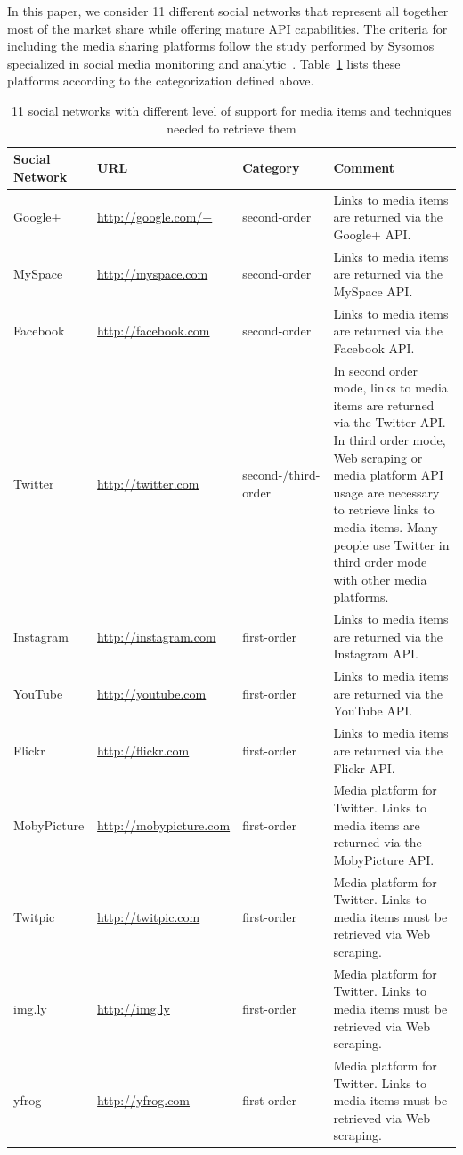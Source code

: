 \documentclass{acm_proc_article-sp}
\newcommand{\inlinelistingsize}{\fontsize{8pt}{11pt}}
\let\oldurl\url
\renewcommand{\url}[1]{\inlinelistingsize\oldurl{#1}}
\begin{document}
In this paper, we consider 11 different social networks that represent all together most of the market share while offering mature API capabilities.
The criteria for including the media sharing platforms follow the study performed by Sysomos specialized in social media monitoring and analytic~\cite{Sysomos2011}. Table~\ref{tab:platforms} lists these platforms according to the categorization defined above.
\begin{table}[htbp]
  {\small
  \begin{tabular}{|l|l|l|p{8cm}|}
    \hline
    \textbf{Social Network} & \textbf{URL} & \textbf{Category} & \textbf{Comment}\\
    \hline
	Google+ & \url{http://google.com/+} & second-order & Links to media items are returned via the Google+ API.\\
	MySpace & \url{http://myspace.com} & second-order & Links to media items are returned via the MySpace API.\\
	Facebook & \url{http://facebook.com} & second-order & Links to media items are returned via the Facebook API.\\
	Twitter & \url{http://twitter.com} & second-/third-order & In second order mode, links to media items are returned via the Twitter API. In third order mode, Web scraping or media platform API usage are necessary to retrieve links to media items. Many people use Twitter in third order mode with other media platforms.\\\hline
	Instagram & \url{http://instagram.com} & first-order & Links to media items are returned via the Instagram API.\\
	YouTube & \url{http://youtube.com} & first-order & Links to media items are returned via the YouTube API.\\
	Flickr & \url{http://flickr.com} & first-order & Links to media items are returned via the Flickr API.\\
	MobyPicture & \url{http://mobypicture.com} & first-order & Media platform for Twitter. Links to media items are returned via the MobyPicture API.\\
	Twitpic & \url{http://twitpic.com} & first-order & Media platform for Twitter. Links to media items must be retrieved via Web scraping.\\
	img.ly & \url{http://img.ly} & first-order & Media platform for Twitter. Links to media items must be retrieved via Web scraping.\\
	yfrog & \url{http://yfrog.com} & first-order & Media platform for Twitter. Links to media items must be retrieved via Web scraping.\\
	\hline
  \end{tabular}
  }
  \label{tab:platforms}
  \caption{11 social networks with different level of support for media items and techniques needed to retrieve them}
\end{table}
\end{document}
